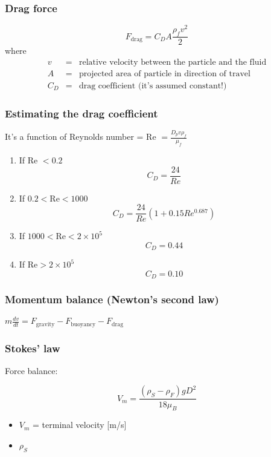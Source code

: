 \begin{frame}\frametitle{Drag force}
	\[
	 	F_\text{drag} = C_D A \frac{\rho_f v^2}{2}
	\]
	where
	\[
		\begin{array}{rcl}
			v	&=& \text{relative velocity between the particle and the fluid}\\
			A	&=& \text{projected area of particle in direction of travel} \\
			C_D	&=& \text{drag coefficient (it's assumed constant!)}
		\end{array}
	\]
\end{frame}

\begin{frame}\frametitle{Estimating the drag coefficient}
	It's a function of Reynolds number = Re $= \displaystyle \frac{D_p v \rho_f}{\mu_f}$ \\
	\begin{enumerate}
		\item	If Re $< 0.2$
				\[
					C_D = \frac{24}{Re}
				\]
				
		\item	If $0.2 < \text{Re} < \text{1000}$
				\[
					C_D = \frac{24}{Re}\left(1 + 0.15 Re^{0.687} \right)
				\]
		\item	If $\text{1000} < \text{Re} < 2\times10^5 $
				\[
					C_D = 0.44
				\]
		\item	If $\text{Re} > 2\times10^5 $
				\[
					C_D = 0.10
				\]			
	\end{enumerate}
	
\end{frame}

\begin{frame}\frametitle{Momentum balance (Newton's second law)}
	$m\frac{dv}{dt} =  F_\text{gravity} - F_\text{buoyancy} - F_\text{drag}$
\end{frame}

\begin{frame}\frametitle{Stokes' law}
	
	Force balance:
	
	\[
		V_m = \frac{\left( \rho_S - \rho_F \right) g D^2}{18 \mu_B}
	\]
	
	
	\begin{itemize}
		\item	$V_m$ = terminal velocity [m/s]
		\item	$\rho_S$ %
	\end{itemize}
	
\end{frame}

